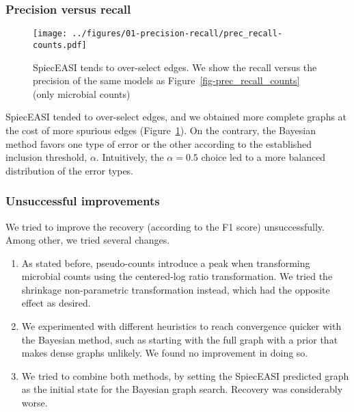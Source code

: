\documentclass[
  a4paper,
]{article}
\providecommand{\tightlist}{%
  \setlength{\itemsep}{0pt}\setlength{\parskip}{0pt}}\usepackage{longtable,booktabs,array}
\begin{document}
\hypertarget{precision-versus-recall}{%
\subsubsection{Precision versus recall}\label{precision-versus-recall}}

\begin{figure}

{\centering \texttt{[image: ../figures/01-precision-recall/prec\_recall-counts.pdf]}

}

\caption{\label{fig-precision_recall_counts}SpiecEASI tends to
over-select edges. We show the recall versus the precision of the same
models as Figure~\ref{fig-prec_recall_counts} (only microbial counts)}

\end{figure}

SpiecEASI tended to over-select edges, and we obtained more complete
graphs at the cost of more spurious edges
(Figure~\ref{fig-precision_recall_counts}). On the contrary, the
Bayesian method favors one type of error or the other according to the
established inclusion threshold, \(\alpha\). Intuitively, the
\(\alpha = 0.5\) choice led to a more balanced distribution of the error
types.

\hypertarget{unsuccessful-improvements}{%
\subsubsection{Unsuccessful
improvements}\label{unsuccessful-improvements}}

We tried to improve the recovery (according to the F1 score)
unsuccessfully. Among other, we tried several changes.

\begin{enumerate}
\def\labelenumi{\arabic{enumi}.}
\tightlist
\item
  As stated before, pseudo-counts introduce a peak when transforming
  microbial counts using the centered-log ratio transformation. We tried
  the shrinkage non-parametric transformation instead, which had the
  opposite effect as desired.
\item
  We experimented with different heuristics to reach convergence quicker
  with the Bayesian method, such as starting with the full graph with a
  prior that makes dense graphs unlikely. We found no improvement in
  doing so.
\item
  We tried to combine both methods, by setting the SpiecEASI predicted
  graph as the initial state for the Bayesian graph search. Recovery was
  considerably worse.
\end{enumerate}
\end{document}
